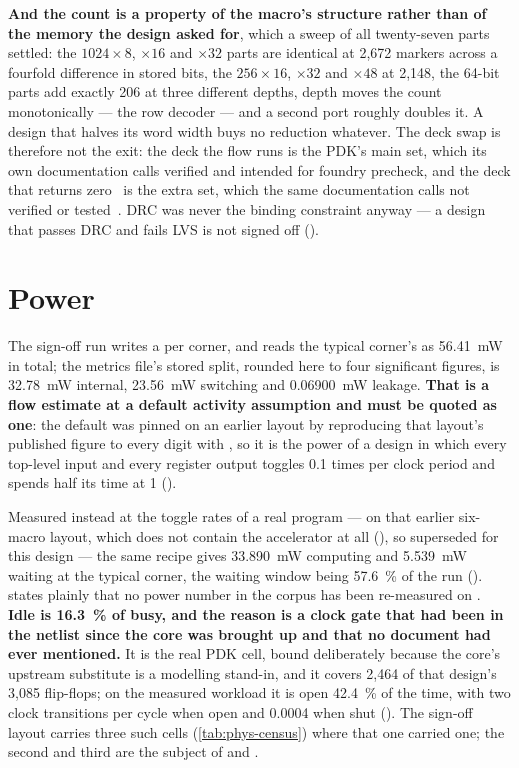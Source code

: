\textbf{And the count is a property of the macro's structure rather than
of the memory the design asked for}, which a sweep of all twenty-seven
parts settled: the $1024\times8$, $\times16$ and $\times32$ parts are
identical at 2,672 markers across a fourfold difference in stored bits,
the $256\times16$, $\times32$ and $\times48$ at 2,148, the 64-bit parts
add exactly 206 at three different depths, depth moves the count
monotonically --- the row decoder --- and a second port roughly doubles
it. A design that halves its word width buys no reduction whatever. The
deck swap is therefore not the exit: the deck the flow runs is the PDK's
main set, which its own documentation calls verified and intended for
foundry precheck, and the deck that returns zero~\cite{companion_tmr} is
the extra set, which the same documentation calls not verified or
tested~\cite{ihppdk}. DRC was never the binding constraint anyway --- a
design that passes DRC and fails LVS is not signed off
().

\section{Power}

The sign-off run writes a  per corner, and
 reads the typical corner's as
\qty{56.41}{\milli\watt} in total; the metrics file's stored split,
rounded here to four significant figures, is \qty{32.78}{\milli\watt}
internal, \qty{23.56}{\milli\watt} switching and
\qty{0.06900}{\milli\watt} leakage. \textbf{That is a flow estimate at a
default activity assumption and must be quoted as one}: the default was
pinned on an earlier layout by reproducing that layout's published
figure to every digit with , so it is the power of a design in which every top-level
input and every register output toggles 0.1 times per clock period and
spends half its time at 1 ().

Measured instead at the toggle rates of a real program --- on that
earlier six-macro layout, which does not contain the accelerator at all
(), so superseded for this design --- the same
recipe gives \qty{33.890}{\milli\watt} computing and
\qty{5.539}{\milli\watt} waiting at the typical corner, the waiting
window being \qty{57.6}{\percent} of the run ().
 states plainly that no power number in the corpus
has been re-measured on .
\textbf{Idle is \qty{16.3}{\percent} of busy, and
the reason is a clock gate that had been in the netlist since the core
was brought up and that no document had ever mentioned.} It is the real
PDK cell, bound deliberately because the core's upstream substitute is a
modelling stand-in, and it covers 2,464 of that design's 3,085
flip-flops; on the measured workload it is open \qty{42.4}{\percent} of
the time, with two clock transitions per cycle when open and 0.0004 when
shut (). The sign-off layout carries three such
cells (\cref{tab:phys-census}) where that one carried one; the second
and third are the subject of  and .

